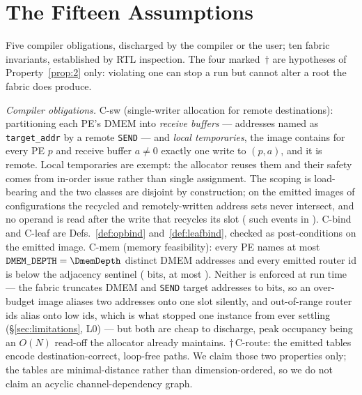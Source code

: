 \documentclass[journal,10pt]{IEEEtran}
\theoremstyle{plain}
\theoremstyle{definition}
\theoremstyle{remark}
\newcommand{\sv}[1]{\texttt{#1}}
\begin{document}
\appendices
\section{The Fifteen Assumptions}\label{app:assumptions}

Five compiler obligations, discharged by the compiler or the user; ten fabric
invariants, established by RTL inspection. The four marked~$\dagger$ are
hypotheses of Property~\ref{prop:2} only: violating one can stop a run but
cannot alter a root the fabric does produce.

\emph{Compiler obligations.}
\textsf{C-sw} (single-writer allocation for remote destinations): partitioning
each PE's DMEM into \emph{receive buffers} --- addresses named as
\texttt{target\_addr} by a remote \texttt{SEND} --- and \emph{local
temporaries}, the image contains for every PE $p$ and receive buffer
$a \neq 0$ exactly one write to $(p,a)$, and it is remote. Local temporaries
are exempt: the allocator reuses them and their safety comes from in-order
issue rather than single assignment. The scoping is load-bearing and the two
classes are disjoint by construction; on the emitted images of
\RecycleConfigs{} configurations the recycled and remotely-written address
sets never intersect, and no operand is read after the write that recycles its
slot (\RecycleUnsafe{} such events in \RecycleEvents{}).
\textsf{C-bind} and \textsf{C-leaf} are Defs.~\ref{def:opbind}
and~\ref{def:leafbind}, checked as post-conditions on the emitted image.
\textsf{C-mem} (memory feasibility): every PE names at most
$\sv{DMEM\_DEPTH} = \DmemDepth$ distinct DMEM addresses and every emitted
router id is below the adjacency sentinel (\RouterIdBits{} bits, at most
\RouterIdMax). Neither is enforced at run time --- the fabric truncates DMEM
and \texttt{SEND} target addresses to \SendAddrBits{} bits, so an over-budget
image aliases two addresses onto one slot silently, and out-of-range router
ids alias onto low ids, which is what stopped one instance from ever settling
(\S\ref{sec:limitations}, L0) --- but both are cheap to discharge, peak
occupancy being an $O(N)$ read-off the allocator already maintains.
$\dagger$\,\textsf{C-route}: the emitted tables encode destination-correct,
loop-free paths. We claim those two properties only; the tables are
minimal-distance rather than dimension-ordered, so we do not claim an acyclic
channel-dependency graph.
\end{document}
